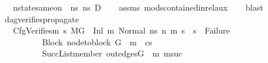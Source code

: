 \begin{isabellebody}
\ \ \ {\isachardoublequoteopen}nstate{\isacharunderscore}{\kern0pt}same{\isacharunderscore}{\kern0pt}on\ {\isasymLambda}\ ns\ ns{\isacharprime}{\kern0pt}\ D{\isachardoublequoteclose}\isanewline
%
\isadelimproof
\ \ %
\endisadelimproof
%
\isatagproof
{}\isamarkupfalse%
\ assms\ mods{\isacharunderscore}{\kern0pt}contained{\isacharunderscore}{\kern0pt}in{\isacharunderscore}{\kern0pt}rel{\isacharunderscore}{\kern0pt}aux\isanewline
\ \ \isamarkupfalse%
\ blast%
\endisatagproof
{\isafoldproof}%
%
\isadelimproof
%
\endisadelimproof
%
\isadelimdocument
%
\endisadelimdocument
%
\isatagdocument
%
\isamarkuptrue%
%
\endisatagdocument
{\isafolddocument}%
%
\isadelimdocument
%
\endisadelimdocument
{}\isamarkupfalse%
\ dag{\isacharunderscore}{\kern0pt}verifies{\isacharunderscore}{\kern0pt}propagate{\isacharcolon}{\kern0pt}\isanewline
\ \ \ CfgVerifies{\isacharcolon}{\kern0pt}{\isachardoublequoteopen}{\isacharparenleft}{\kern0pt}{\isasymAnd}m{}{\isacharprime}{\kern0pt}\ s{}{\isacharprime}{\kern0pt}{\isachardot}{\kern0pt}\ {\isacharparenleft}{\kern0pt}M{\isacharcomma}{\kern0pt}{\isasymLambda}{\isacharcomma}{\kern0pt}{\isasymGamma}{\isacharcomma}{\kern0pt}{\isasymOmega}{\isacharcomma}{\kern0pt}G\ {\isasymturnstile}\ {\isacharparenleft}{\kern0pt}Inl\ m{\isacharcomma}{\kern0pt}\ Normal\ ns{\isacharparenright}{\kern0pt}\ {\isacharminus}{\kern0pt}n{\isasymrightarrow}{\isacharasterisk}{\kern0pt}\ {\isacharparenleft}{\kern0pt}m{}{\isacharprime}{\kern0pt}{\isacharcomma}{\kern0pt}\ s{}{\isacharprime}{\kern0pt}{\isacharparenright}{\kern0pt}{\isacharparenright}{\kern0pt}\ {\isasymLongrightarrow}\ s{}{\isacharprime}{\kern0pt}\ {\isasymnoteq}\ Failure{\isacharparenright}{\kern0pt}{\isachardoublequoteclose}\ \isanewline
\ \ \ \ \ \ \ \ \ \ Block{\isacharcolon}{\kern0pt}\ {\isachardoublequoteopen}node{\isacharunderscore}{\kern0pt}to{\isacharunderscore}{\kern0pt}block\ G\ {\isacharbang}{\kern0pt}\ m\ {\isacharequal}{\kern0pt}\ cs{\isachardoublequoteclose}\ \isanewline
\ \ \ \ \ \ \ \ \ \ Succ{\isacharcolon}{\kern0pt}{\isachardoublequoteopen}List{\isachardot}{\kern0pt}member\ {\isacharparenleft}{\kern0pt}out{\isacharunderscore}{\kern0pt}edges{\isacharparenleft}{\kern0pt}G{\isacharparenright}{\kern0pt}\ {\isacharbang}{\kern0pt}\ m{\isacharparenright}{\kern0pt}\ msuc{\isachardoublequoteclose}\ \isanewline

\end{isabellebody}
